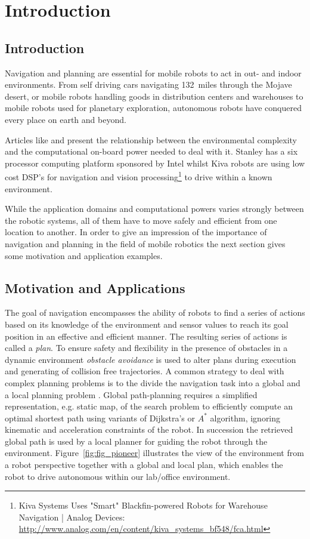 \chapter{Introduction}\label{ch:introduction}
\section{Introduction}
Navigation and planning are essential for mobile robots to act in out- and indoor environments. 
From self driving cars navigating 132~miles through the Mojave desert, or mobile robots handling goods in distribution centers and warehouses to mobile robots used for planetary exploration, autonomous robots have conquered every place on earth and beyond.
 
Articles like \cite{stanley} and \cite{kiva} present the relationship between the environmental complexity and the computational on-board power needed to deal with it.
Stanley has a six processor computing platform sponsored by Intel whilst Kiva robots are using low cost DSP's for navigation and vision processing\footnote{Kiva Systems Uses "Smart" Blackfin-powered Robots for Warehouse Navigation | Analog Devices: \url{http://www.analog.com/en/content/kiva_systems_bf548/fca.html}} to drive within a known environment.  

While the application domains and computational powers varies strongly between the robotic systems, all of them have to move safely and efficient from one location to another.   
In order to give an impression of the importance of navigation and planning in the field of mobile robotics the next section gives some motivation and application examples.

\section{Motivation and Applications}\label{sec:motivation} 
The goal of navigation encompasses the ability of robots to find a series of actions based on its knowledge of the environment and sensor values to reach its goal position in an effective and efficient manner.
The resulting series of actions is called a \emph{plan}. 
To ensure safety and flexibility in the presence of obstacles in a dynamic environment \emph{obstacle avoidance} is used to alter plans during execution and generating of collision free trajectories.
A common strategy to deal with complex planning problems is to the divide the navigation task into a global and a local planning problem \cite{LaValle2006}.
Global path-planning requires a simplified representation, e.g. static map, of the search problem to efficiently compute an optimal shortest path using variants of Dijkstra's \cite{dijkstra1959note} or $A^*$ \cite{DBLP:journals/tssc/HartNR68/Astar} algorithm, ignoring kinematic and acceleration constraints of the robot.
In succession the retrieved global path is used by a local planner for guiding the robot through the environment.
Figure~\ref{fig:fig_pioneer} illustrates the view of the environment from a robot perspective together with a global and local plan, which enables the robot to drive autonomous within our lab/office environment.

